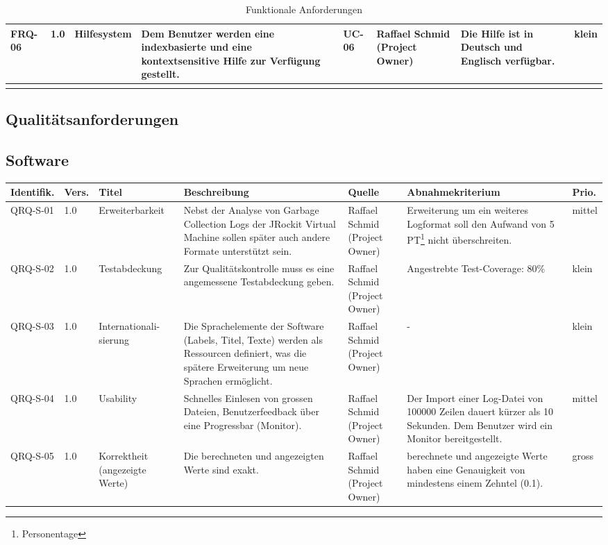\begin{landscape}
\begin{longtable}{|p{1.5cm}|p{0.7cm}|p{2.5cm}|p{3.9cm}|p{1.2cm}|p{2.5cm}|p{3.3cm}|p{0.8cm}|}
  FRQ-06 & 1.0 & Hilfesystem &  Dem Benutzer werden eine indexbasierte und eine kontextsensitive Hilfe zur Verfügung gestellt. & UC-06 & Raffael Schmid (Project Owner) & Die Hilfe ist in Deutsch und Englisch verfügbar. & klein \\\hline
\caption{Funktionale Anforderungen}
\end{longtable}
\end{landscape}

\begin{landscape}
\section{Qualitätsanforderungen}
\subsection{Software}
\begin{longtable}{|p{1.6cm}|p{0.7cm}|p{2.5cm}|p{4.5cm}|p{2.6cm}|p{4cm}|p{0.9cm}|}
    \hline
    \textbf{Identifik.} & \textbf{Vers.}& \textbf{Titel} & \textbf{Beschreibung} & \textbf{Quelle} & \textbf{Abnahmekriterium} & \textbf{Prio.}\\\hline
   QRQ-S-01 & 1.0 & Erweiterbarkeit & Nebst der Analyse von Garbage Collection Logs der JRockit Virtual Machine sollen später auch andere Formate unterstützt sein. & Raffael Schmid (Project Owner) & Erweiterung um ein weiteres Logformat soll den Aufwand von 5 PT\footnote{Personentage} nicht überschreiten. & mittel \\\hline
   QRQ-S-02 & 1.0 & Testabdeckung & Zur Qualitätskontrolle muss es eine angemessene Testabdeckung geben. & Raffael Schmid (Project Owner) & Angestrebte Test-Coverage: 80\% & klein \\\hline

  QRQ-S-03 & 1.0 & Internationali-sierung & Die Sprachelemente der Software (Labels, Titel, Texte) werden als Ressourcen definiert, was die spätere Erweiterung um neue Sprachen ermöglicht. & Raffael Schmid (Project Owner) & - & klein\\\hline

   QRQ-S-04 & 1.0 & Usability & Schnelles Einlesen von grossen Dateien, Benutzerfeedback über eine Progressbar (Monitor). & Raffael Schmid (Project Owner) & Der Import einer Log-Datei von 100000 Zeilen dauert kürzer als 10 Sekunden. Dem Benutzer wird ein Monitor bereitgestellt.&mittel \\\hline

  QRQ-S-05 & 1.0 & Korrektheit (angezeigte Werte) & Die berechneten und angezeigten Werte sind exakt. & Raffael Schmid (Project Owner) & berechnete und angezeigte Werte haben eine Genauigkeit von mindestens einem Zehntel (0.1). & gross\\\hline
  

\end{longtable}
\end{landscape}
